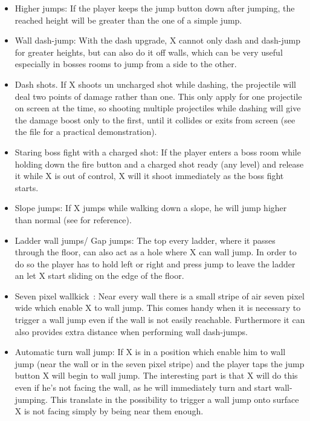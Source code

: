 \begin{itemize}
	\item Higher jumps: If the player keeps the jump button down after jumping, the reached height will be greater than the one of a simple jump.
	
	\item Wall dash-jump: With the dash upgrade, X cannot only dash and dash-jump for greater heights, but can also do it off walls, which can be very useful especially in bosses rooms to jump from a side to the other.
	
	\item Dash shots. If X shoots un uncharged shot while dashing, the projectile will deal two points of damage rather than one. This only apply for one projectile on screen at the time, so shooting multiple projectiles while dashing will give the damage boost only to the first, until it collides or exits from screen (see the file  for a practical demonstration).
	
	\item Staring boss fight with a charged shot: If the player enters a boss room while holding down the fire button and a charged shot ready (any level) and release it while X is out of control, X will it shoot immediately as the boss fight starts.
	
	\item Slope jumps: If X jumps while walking down a slope, he will jump higher than normal (see  for reference).
	
	\item Ladder wall jumps/ Gap jumps: The top every ladder, where it passes through the floor, can also act as a hole where X can wall jump. In order to do so the player has to hold left or right and press jump to leave the ladder an let X start sliding on the edge of the floor.
	
	\item Seven pixel wallkick~\cite{MMX_RTA_wiki:basics}: Near every wall there is a small stripe of air seven pixel wide which enable X to wall jump. This comes handy when it is necessary to trigger a wall jump even if the wall is not easily reachable. Furthermore it can also provides extra distance when performing wall dash-jumps.
	
	\item Automatic turn wall jump: If X is in a position which enable him to wall jump (near the wall or in the seven pixel stripe) and the player taps the jump button X will begin to wall jump. The interesting part is that X will do this even if he's not facing the wall, as he will immediately turn and start wall-jumping. This translate in the possibility to trigger a wall jump onto surface X is not facing simply by being near them enough.
\end{itemize}

